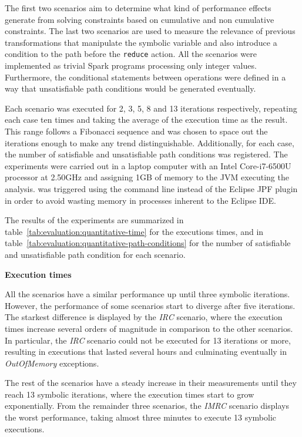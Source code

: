 The first two scenarios aim to determine what kind of performance effects generate from solving constraints based on cumulative and non cumulative constraints. The last two scenarios are used to measure the relevance of previous transformations that manipulate the symbolic variable and also introduce a condition to the path before the \texttt{reduce} action. All the scenarios were implemented as trivial Spark programs processing only integer values. Furthermore, the conditional statements between operations were defined in a way that unsatisfiable path conditions would be generated eventually.

Each scenario was executed for 2, 3, 5, 8 and 13 iterations respectively, repeating each case ten times and taking the average of the execution time as the result. This range follows a Fibonacci sequence and was chosen to space out the iterations enough to make any trend distinguishable. Additionally, for each case, the number of satisfiable and unsatisfiable path conditions was registered. The experiments were carried out in a laptop computer with an Intel Core-i7-6500U processor at 2.50GHz and assigning 1GB of memory to the JVM executing the analysis. \jpf{} was triggered using the command line instead of the Eclipse JPF plugin in order to avoid wasting memory in processes inherent to the Eclipse IDE.


The results of the experiments are summarized in table~\ref{tab:evaluation:quantitative-time} for the executions times, and in table~\ref{tab:evaluation:quantitative-path-conditions} for the number of satisfiable and unsatisfiable path condition for each scenario.

\textbf{Execution times}

All the scenarios have a similar performance up until three symbolic iterations. However, the performance of some scenarios start to diverge after five iterations. The starkest difference is displayed by the \textit{IRC} scenario, where the execution times increase several orders of magnitude in comparison to the other scenarios. In particular, the \textit{IRC} scenario could not be executed for 13 iterations or more, resulting in executions that lasted several hours and culminating eventually in \textit{OutOfMemory} exceptions.

The rest of the scenarios have a steady increase in their measurements until they reach 13 symbolic iterations, where the execution times start to grow exponentially. From the remainder three scenarios, the \textit{IMRC} scenario displays the worst performance, taking almost three minutes to execute 13 symbolic executions. 

